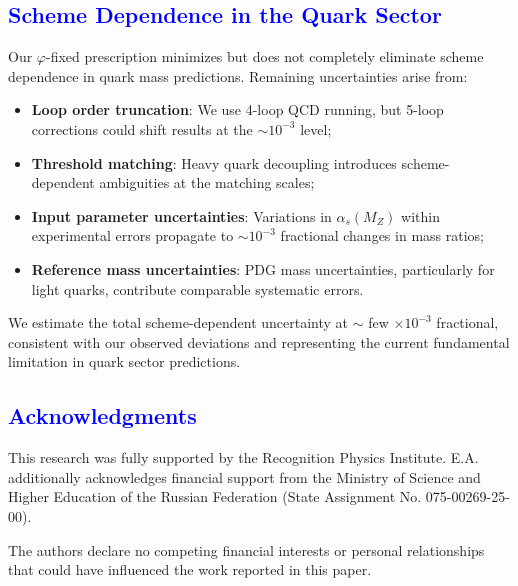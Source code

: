 \documentclass[%
amsmath,amssymb,
aps,
prb,
floatfix, showkeys, 10pt,
]{revtex4-2}
\newcommand{\modif}[1]{\textcolor{blue}{#1}}
\begin{document}
{\modif{ \section{Scheme Dependence in the Quark Sector}
\label{subsec:scheme_dependence}  }}
Our $\varphi$-fixed prescription minimizes but does not completely eliminate scheme dependence in quark mass predictions. Remaining uncertainties arise from:
\begin{itemize}
\item \textbf{Loop order truncation}: We use 4-loop QCD running, but 5-loop corrections could shift results at the $\sim 10^{-3}$ level;

\item \textbf{Threshold matching}: Heavy quark decoupling introduces scheme-dependent ambiguities at the matching scales;

\item \textbf{Input parameter uncertainties}: Variations in $\alpha_s(M_Z)$ within experimental errors propagate to $\sim 10^{-3}$ fractional changes in mass ratios;

\item \textbf{Reference mass uncertainties}: PDG mass uncertainties, particularly for light quarks, contribute comparable systematic errors.
\end{itemize}

We estimate the total scheme-dependent uncertainty at $\sim$ few $\times 10^{-3}$ fractional, consistent with our observed deviations and representing the current fundamental limitation in quark sector predictions.
















{\modif{ \section*{Acknowledgments}  }}
This research was fully supported by the Recognition Physics Institute.
 E.A. additionally acknowledges financial support from the Ministry of Science and Higher Education of the
     Russian Federation (State Assignment No. 075-00269-25-00).

The authors declare no competing financial interests or personal relationships that could have influenced the work reported in this paper.
\end{document}

